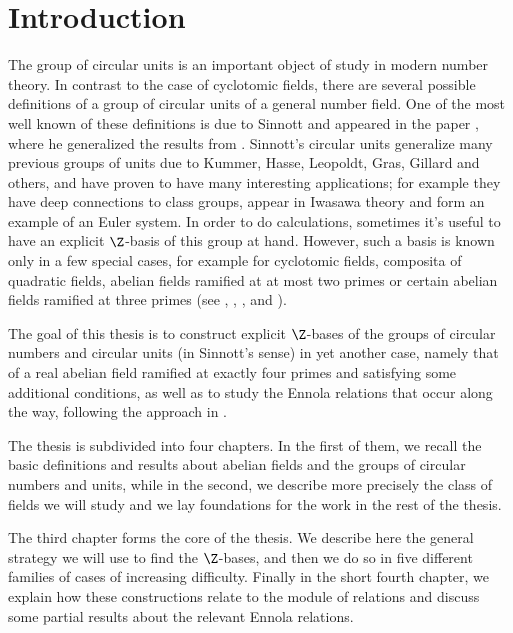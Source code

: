 \chapter*{Introduction}

The group of circular units is an important object of study in modern number theory. In contrast to the case of cyclotomic fields, there are several possible definitions of a group of circular units of a general number field. One of the most well known of these definitions is due to Sinnott and appeared in the paper \citep{SinnottAb}, where he generalized the results from \citep{SinnottCirc}. Sinnott's circular units generalize many previous groups of units due to Kummer, Hasse, Leopoldt, Gras, Gillard and others, and have proven to have many interesting applications; for example they have deep connections to class groups, appear in Iwasawa theory and form an example of an Euler system. In order to do calculations, sometimes it's useful to have an explicit $\Z$-basis of this group at hand. However, such a basis is known only in a few special cases, for example for cyclotomic fields, composita of quadratic fields, abelian fields ramified at at most two primes or certain abelian fields ramified at three primes (see \citep{Kucera1992}, \citep{Kucera1996}, \citep{Dohmae1996}, \citep{Dohmae1997} and \citep{Kucera2016}).
\bigskip

The goal of this thesis is to construct explicit $\Z$-bases of the groups of circular numbers and circular units (in Sinnott's sense) in yet another case, namely that of a real abelian field ramified at exactly four primes and satisfying some additional conditions, as well as to study the Ennola relations that occur along the way, following the approach in \citep{Kucera2016}. \medskip

The thesis is subdivided into four chapters. In the first of them, we recall the basic definitions and results about abelian fields and the groups of circular numbers and units, while in the second, we describe more precisely the class of fields we will study and we lay foundations for the work in the rest of the thesis.\medskip

The third chapter forms the core of the thesis. We describe here the general strategy we will use to find the $\Z$-bases, and then we do so in five different families of cases of increasing difficulty. Finally in the short fourth chapter, we explain how these constructions relate to the module of relations and discuss some partial results about the relevant Ennola relations.\medskip

